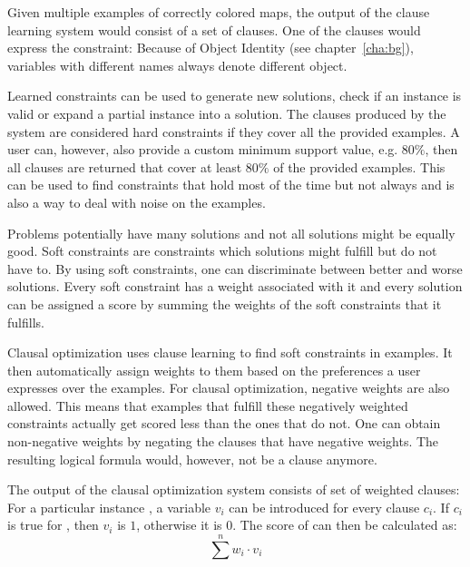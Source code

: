 \begin{example}
Given multiple examples of correctly colored maps, the output of the clause learning system would consist of a set of clauses. One of the clauses would express the constraint: 
Because of Object Identity (see chapter~\ref{cha:bg}), variables with different names always denote different object.
\end{example}

Learned constraints can be used to generate new solutions, check if an instance is valid or expand a partial instance into a solution.
The clauses produced by the system are considered hard constraints if they cover all the provided examples.
A user can, however, also provide a custom minimum support value, e.g. $80\%$, then all clauses are returned that cover at least $80\%$ of the provided examples.
This can be used to find constraints that hold most of the time but not always and is also a way to deal with noise on the examples.

Problems potentially have many solutions and not all solutions might be equally good.
Soft constraints are constraints which solutions might fulfill but do not have to.
By using soft constraints, one can discriminate between better and worse solutions.
Every soft constraint has a weight associated with it and every solution can be assigned a score by summing the weights of the soft constraints that it fulfills.

Clausal optimization uses clause learning to find soft constraints in examples.
It then automatically assign weights to them based on the preferences a user expresses over the examples.
For clausal optimization, negative weights are also allowed.
This means that examples that fulfill these negatively weighted constraints actually get scored less than the ones that do not.
One can obtain non-negative weights by negating the clauses that have negative weights.
The resulting logical formula would, however, not be a clause anymore.

The output of the clausal optimization system consists of set of weighted clauses: 
For a particular instance , a variable $v_i$ can be introduced for every clause $c_i$.
If $c_i$ is true for , then $v_i$ is $1$, otherwise it is $0$. The score of  can then be calculated as:
\begin{equation}
\sum\limits^n w_i \cdot v_i
\end{equation}

